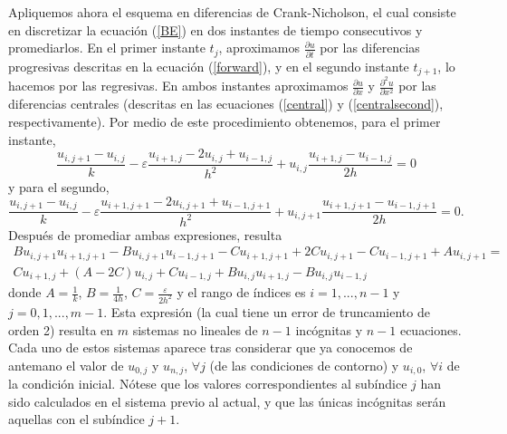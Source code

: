 Apliquemos ahora el esquema en diferencias de Crank-Nicholson, el cual consiste en discretizar la ecuación (\ref{BE}) en dos instantes de tiempo consecutivos y promediarlos. En el primer instante $t_j$, aproximamos $\frac{\partial u}{\partial t}$ por las diferencias progresivas descritas en la ecuación (\ref{forward}), y en el segundo instante $t_{j+1}$, lo hacemos por las regresivas. En ambos instantes aproximamos $\frac{\partial u}{\partial x}$ y $\frac{\partial^2u}{\partial x^2}$  por las diferencias centrales (descritas en las ecuaciones (\ref{central}) y (\ref{centralsecond}), respectivamente). Por medio de este procedimiento obtenemos, para el primer instante,
\begin{equation} \label{firstinstant}
\frac{u_{i,j+1}-u_{i,j}}{k}-\varepsilon\frac{u_{i+1,j}-2u_{i,j}+u_{i-1,j}}{h^2}+u_{i,j}\frac{u_{i+1,j}-u_{i-1,j}}{2h}=0
\end{equation}
y para el segundo,
\begin{equation} \label{secondinstant}
\frac{u_{i,j+1}-u_{i,j}}{k}-\varepsilon\frac{u_{i+1,j+1}-2u_{i,j+1}+u_{i-1,j+1}}{h^2}+u_{i,j+1}\frac{u_{i+1,j+1}-u_{i-1,j+1}}{2h}=0.
\end{equation}
Después de promediar ambas expresiones, resulta
\begin{eqnarray} \label{average}
Bu_{i,j+1}u_{i+1,j+1}-Bu_{i,j+1}u_{i-1,j+1}-Cu_{i+1,j+1}+2Cu_{i,j+1}-Cu_{i-1,j+1}+Au_{i,j+1}=\\\nonumber Cu_{i+1,j}+(A-2C)u_{i,j}+Cu_{i-1,j}+Bu_{i,j}u_{i+1,j}-Bu_{i,j}u_{i-1,j}
\end{eqnarray}
donde $A=\frac{1}{k}$, $B=\frac{1}{4h}$,
$C=\frac{\varepsilon}{2h^2}$ y el rango de índices es
$i=1,...,n-1$ y $j=0,1,...,m-1$. Esta expresión (la cual tiene un error de truncamiento de orden 2) resulta en $m$ sistemas no lineales de $n-1$ incógnitas y $n-1$ ecuaciones. Cada uno de estos sistemas aparece tras considerar que ya conocemos de antemano el valor de $u_{0,j}$ y	$u_{n,j}$, $\forall j$ (de las condiciones de contorno) y $u_{i,0}$,
$\forall i$ de la condición inicial. Nótese que los valores correspondientes al subíndice $j$ han sido calculados en el sistema previo al actual, y que las únicas incógnitas serán aquellas con el subíndice $j+1$.

